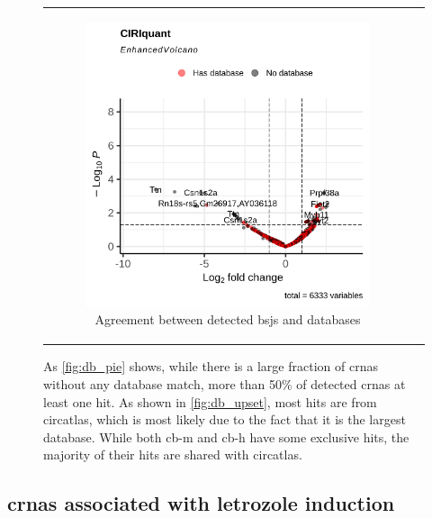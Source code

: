 \begin{figure}[H]
\begin{tabular}{cc}
\begin{subfigure}{0.5\textwidth}
            \includegraphics[width=\linewidth]{chapters/4_results_and_discussion/figures/dea/ciriquant/tamoxifen/volcano.png}
            \caption{Agreement between detected
                \glspl{bsj} and databases}
            \label{fig:tamoxifen_volcano_ciriquant}
        \end{subfigure} &

    \end{tabular}
    \caption{As \cref{fig:db_pie} shows, while there is a large fraction of
        \glspl{crna} without any
        database match, more than 50\% of detected \glspl{crna} at least one
        hit.
        As shown in \cref{fig:db_upset}, most hits are from \gls{circatlas}, which is
        most likely due to the fact that it is the largest database.
        While both \gls{cb-m} and \gls{cb-h} have some exclusive hits, the majority of
        their hits are shared with \gls{circatlas}.
    }
    \label{fig:tamoxifen_volcano}
\end{figure}

\subsection{\Glspl{crna} associated with letrozole induction}

